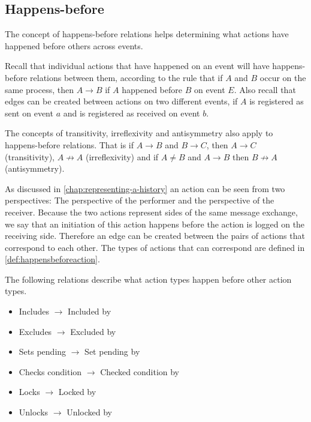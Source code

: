 	\subsection{Happens-before}
	The concept of happens-before relations helps determining what actions have happened before others across events.
	
	Recall that individual actions that have happened on an event will have happens-before relations between them, according to the rule that if $A$ and $B$ occur on the same process, then $A \rightarrow B$ if $A$ happened before $B$ on event $E$.
	Also recall that edges can be created between actions on two different events, if $A$ is registered as sent on event $a$ and is registered as received on event $b$.
	
	The concepts of transitivity, irreflexivity and antisymmetry also apply to happens-before relations. That is if $A \rightarrow B$ and $B \rightarrow C$, then $A \rightarrow C$ (transitivity), $A \not\rightarrow A$ (irreflexivity) and if $A \neq B$ and $A \rightarrow B$ then $B \not\rightarrow A$ (antisymmetry).
	
	\newpar As discussed in \autoref{chap:representing-a-history} an action can be seen from two perspectives: The perspective of the performer and the perspective of the receiver.
	Because the two actions represent sides of the same message exchange, we say that an initiation of this action happens before the action is logged on the receiving side. Therefore an edge can be created between the pairs of actions that correspond to each other. The types of actions that can correspond are defined in \autoref{def:happensbeforeaction}.
	
	\begin{definition}
		The following relations describe what action types happen before other action types.
			\begin{itemize}
				\item Includes $\rightarrow$ Included by
				\item Excludes $\rightarrow$ Excluded by
				\item Sets pending $\rightarrow$ Set pending by
				\item Checks condition $\rightarrow$ Checked condition by
				\item Locks $\rightarrow$ Locked by
				\item Unlocks $\rightarrow$ Unlocked by
			\end{itemize}
			\label{def:happensbeforeaction}
	\end{definition}
	
